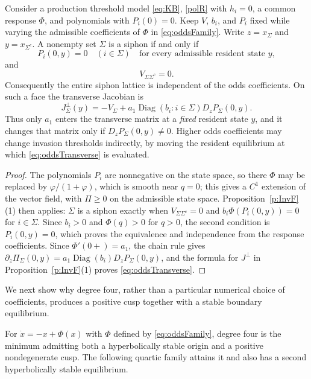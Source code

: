 Consider a production threshold model \eqref{eq:KB}, \eqref{polR} with $h_i=0$, a common
response $\Phi$, and polynomials with $P_i(0)=0$. Keep $V$, $b_i$, and $P_i$ fixed while varying the
admissible coefficients of $\Phi$ in \eqref{eq:oddsFamily}.
Write $z=x_\Sigma$ and $y=x_{\Sigma^c}$.
A nonempty set $\Sigma$ is a siphon if and only if
\[
 P_i(0,y)=0\quad(i\in\Sigma)
 \quad\text{for every admissible resident state }y,
\]
and
\begin{equation}\label{eq:oddsNoLinCoupling}
 V_{\Sigma\Sigma^c}=0.
\end{equation}
Consequently the entire siphon lattice is independent of the odds
coefficients. On such a face the transverse Jacobian is
\begin{equation}\label{eq:oddsTransverse}
 J_\Sigma^\perp(y)
 =-V_\Sigma
 +a_1\operatorname{Diag}(b_i:i\in\Sigma)D_zP_\Sigma(0,y).
\end{equation}
Thus only $a_1$ enters the transverse matrix at a \emph{fixed} resident
state $y$, and it changes that matrix only if
$D_zP_\Sigma(0,y)\ne0$. Higher odds coefficients may change invasion
thresholds indirectly, by moving the resident equilibrium at which
\eqref{eq:oddsTransverse} is evaluated.
\eeP
\begin{proof}
The polynomials $P_i$ are nonnegative on the state space, so there $\Phi$ may be replaced by
$\varphi/(1+\varphi)$, which is smooth near $q=0$; this gives a $C^1$ extension of the vector field,
with $\Pi\ge0$ on the admissible state space. Proposition~\ref{p:InvF}(1) then applies: $\Sigma$ is a siphon exactly when
$V_{\Sigma\Sigma^c}=0$ and $b_i\Phi(P_i(0,y))=0$ for $i\in\Sigma$. Since $b_i>0$ and $\Phi(q)>0$ for
$q>0$, the second condition is $P_i(0,y)=0$, which proves the equivalence and independence from
the response coefficients. Since $\Phi'(0+)=a_1$, the chain rule gives
$\partial_z\Pi_\Sigma(0,y)=a_1\operatorname{Diag}(b_i)D_zP_\Sigma(0,y)$, and the formula for
$J^\perp$ in Proposition~\ref{p:InvF}(1) proves \eqref{eq:oddsTransverse}.
\end{proof}

We next show why degree four, rather than a particular numerical choice
of coefficients, produces a positive cusp together with a stable
boundary equilibrium.

\label{p:Min}
For $\dot x=-x+\Phi(x)$ with $\Phi$ defined by \eqref{eq:oddsFamily},
degree four is the minimum admitting both a hyperbolically stable
origin and a positive nondegenerate cusp. The following quartic
family attains it and also has a second hyperbolically stable equilibrium.

